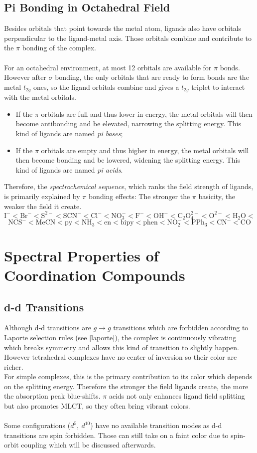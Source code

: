 \subsection{Pi Bonding in Octahedral Field}
%
Besides orbitals that point towards the metal atom, ligands also have orbitals perpendicular to the ligand-metal axis. 
Those orbitals combine and contribute to the $\pi$ bonding of the complex.\\ \\
%
For an octahedral environment, at most 12 orbitals are available for $\pi$ bonds.
However after $\sigma$ bonding, the only orbitals that are ready to form bonds are the metal $t_{2g}$ ones, 
so the ligand orbitals combine and gives a $t_{2g}$ triplet to interact with the metal orbitals.
%
\begin{itemize}
	\item If the $\pi$ orbitals are full and thus lower in energy, the metal orbitals will then become antibonding and be elevated, 
		narrowing the splitting energy. This kind of ligands are named \emph{pi bases};
	\item If the $\pi$ orbitals are empty and thus higher in energy, the metal orbitals will then become bonding and be lowered, 
		widening the splitting energy. This kind of ligands are named \emph{pi acids}.
\end{itemize}
%
Therefore, the \emph{spectrochemical sequence}, which ranks the field strength of ligands, 
is primarily explained by $\pi$ bonding effects:
The stronger the $\pi$ basicity, the weaker the field it create.\\
%
\[
	\text{I}^- < \text{Br}^- < \text{S}^{2-} < \text{SCN}^- < \text{Cl}^- < 
	\text{NO}_3^- < \text{F}^- < \text{OH}^- < \text{C}_2\text{O}_4^{2-} < 
	\text{O}^{2-} < \text{H}_2\text{O} <\]\[ \text{NCS}^- < \text{MeCN} < 
	\text{py} < \text{NH}_3 < \text{en} < \text{bipy} < \text{phen} < 
	\text{NO}_2^- < \text{PPh}_3 < \text{CN}^- < \text{CO}
\]
%
\section{Spectral Properties of Coordination Compounds}
\subsection{d-d Transitions}
%
Although d-d transitions are $g\to g$ transitions which are forbidden according to Laporte selection rules (see \ref{laporte}), 
the complex is continuously vibrating which breaks symmetry and allows this kind of transition to slightly happen.
However tetrahedral complexes have no center of inversion so their color are richer. \\
%
For simple complexes, this is the primary contribution to its color which depends on the splitting energy. 
Therefore the stronger the field ligands create, the more the absorption peak blue-shifts. 
$\pi$ acids not only enhances ligand field splitting but also promotes MLCT, so they often bring vibrant colors.\\ \\
%
Some configurations ($d^5,\ d^{10}$) have no available transition modes as d-d transitions are spin forbidden. 
Those can still take on a faint color due to spin-orbit coupling which will be discussed afterwards.
%
